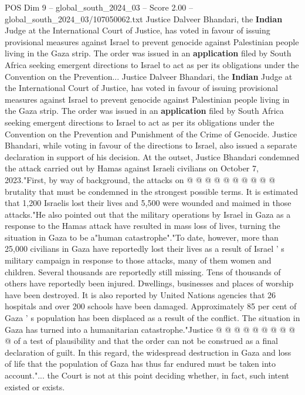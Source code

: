 \begin{textsample}{POS Dim 9 – global\_south\_2024\_03 – Score 2.00 – global\_south\_2024\_03/107050062.txt}  \label{ex:f9_pos_067}
Justice Dalveer Bhandari, the \textbf{Indian} Judge at the International Court of Justice, has voted in favour of issuing provisional measures against Israel to prevent genocide against Palestinian people living in the Gaza strip.
The order was issued in an \textbf{application} filed by South Africa seeking emergent directions to Israel to act as per its obligations under the Convention on the Prevention...
Justice Dalveer Bhandari, the \textbf{Indian} Judge at the International Court of Justice, has voted in favour of issuing provisional measures against Israel to prevent genocide against Palestinian people living in the Gaza strip.
The order was issued in an \textbf{application} filed by South Africa seeking emergent directions to Israel to act as per its obligations under the Convention on the Prevention and Punishment of the Crime of Genocide.
Justice Bhandari, while voting in favour of the directions to Israel, also issued a separate declaration in support of his decision.
At the outset, Justice Bhandari condemned the attack carried out by Hamas against Israeli civilians on October 7, 2023."First, by way of background, the attacks on @ @ @ @ @ @ @ @ @ @ brutality that must be condemned in the strongest possible terms.
It is estimated that 1,200 Israelis lost their lives and 5,500 were wounded and maimed in those attacks."He also pointed out that the military operations by Israel in Gaza as a response to the Hamas attack have resulted in mass loss of lives, turning the situation in Gaza to be a"human catastrophe"."To date, however, more than 25,000 civilians in Gaza have reportedly lost their lives as a result of Israel ' s military campaign in response to those attacks, many of them women and children.
Several thousands are reportedly still missing.
Tens of thousands of others have reportedly been injured.
Dwellings, businesses and places of worship have been destroyed.
It is also reported by United Nations agencies that 26 hospitals and over 200 schools have been damaged.
Approximately 85 per cent of Gaza ' s population has been displaced as a result of the conflict.
The situation in Gaza has turned into a humanitarian catastrophe."Justice @ @ @ @ @ @ @ @ @ @ of a test of plausibility and that the order can not be construed as a final declaration of guilt.
In this regard, the widespread destruction in Gaza and loss of life that the population of Gaza has thus far endured must be taken into account."... the Court is not at this point deciding whether, in fact, such intent existed or exists.

\end{textsample}
